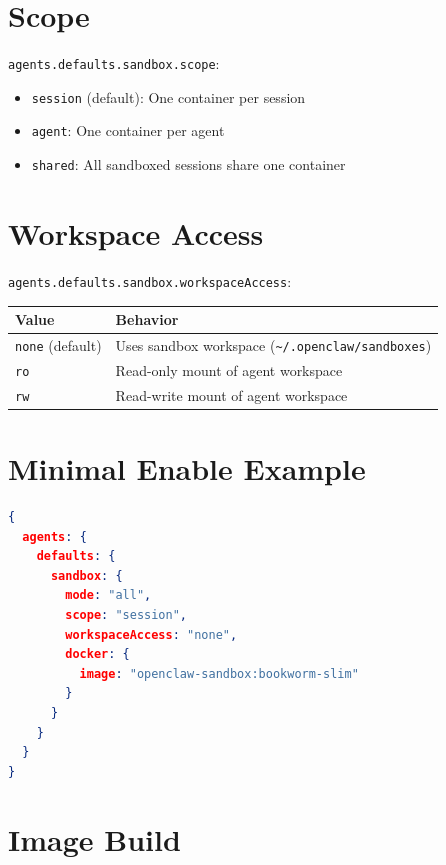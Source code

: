 \section{Scope}

\texttt{agents.defaults.sandbox.scope}:

\begin{itemize}
  \item \texttt{session} (default): One container per session
  \item \texttt{agent}: One container per agent
  \item \texttt{shared}: All sandboxed sessions share one container
\end{itemize}

\section{Workspace Access}

\texttt{agents.defaults.sandbox.workspaceAccess}:

\begin{center}
\begin{tabular}{ll}
\toprule
\textbf{Value} & \textbf{Behavior} \\
\midrule
\texttt{none} (default) & Uses sandbox workspace (\texttt{\textasciitilde{}/.openclaw/sandboxes}) \\
\texttt{ro} & Read-only mount of agent workspace \\
\texttt{rw} & Read-write mount of agent workspace \\
\bottomrule
\end{tabular}
\end{center}

\section{Minimal Enable Example}

\begin{lstlisting}[language=json]
{
  agents: {
    defaults: {
      sandbox: {
        mode: "all",
        scope: "session",
        workspaceAccess: "none",
        docker: {
          image: "openclaw-sandbox:bookworm-slim"
        }
      }
    }
  }
}
\end{lstlisting}

\section{Image Build}

